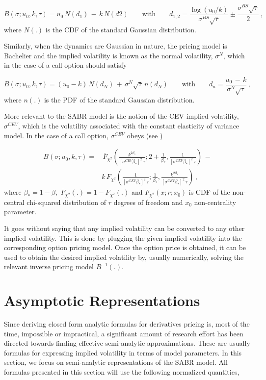 \documentclass[12pt,oneside]{article}
\newcommand{\beqn}{\begin{equation}}
\newcommand{\eeqn}{\end{equation}}
\numberwithin{equation}{section}
\begin{document}
\beqn
B(\sigma;u_0,k,\tau)=u_0\,N(d_1)\,-\,k\,N(d2)\quad\quad\text{with}\quad\quad
d_{1,2}=\frac{\log(u_0/k)}{\sigma^{BS}\sqrt{\tau}}
\pm \frac{\sigma^{BS}\sqrt{\tau}}{2}\,,
\eeqn
where $N(.)$ is the CDF of the standard Gaussian distribution.

Similarly, when the dynamics are Gaussian in nature, the 
pricing model is Bachelier and the implied volatility is known as the
normal volatility, $\sigma^{N}$, which
in the case of a call option should satisfy

\beqn
B(\sigma;u_0,k,\tau)=(u_0-k)\,N(d_N)\,+\,\sigma^{N}\sqrt{\tau}\,n(d_N)\quad\quad
\text{with}\quad\quad d_n=\frac{u_0\,-\,k}{\sigma^N\sqrt{\tau}}\,,
\eeqn
where $n(.)$ is the PDF of the standard Gaussian distribution.

More relevant to the SABR model is the notion of the CEV implied volatility,
$\sigma^{CEV}$,
which is the volatility associated with the constant elasticity of variance
model.
In the case of a call option, $\sigma^{CEV}$ obeys (see \cite{CW})

\beqn
\begin{aligned}
B(\sigma;u_0,k,\tau)=&\,\bar{F}_{\chi^2}\left(\frac{k^{2\beta_*}}{[\sigma^{CEV}\beta_*]^2\,\tau};
2+\frac{1}{\beta_*},\frac{1}{[\sigma^{CEV}\beta_*]^2\,\tau}\right)\,-\\[5pt]
&k\,
F_{\chi^2}\left(\frac{1}{[\sigma^{CEV}\beta_*]^2\,\tau};
\frac{1}{\beta_*},\frac{k^{2\beta_*}}{[\sigma^{CEV}\beta_*]^2\,\tau}\right)\,,
\end{aligned}
\eeqn
where $\beta_*\!=\!1\!-\!\beta$, $\,\bar{F}_{\chi^2}(.)\!=\!1-\!F_{\chi^2}(.)$ and
$F_{\chi^2}(x;r;x_0)$ is CDF of the non-central chi-squared distribution 
of $r$ degrees of freedom and $x_0$ non-centrality parameter.

It goes without saying that any implied volatility can be converted to
any other implied volatility.
This is done by plugging the given implied volatility into the
corresponding option pricing model.
Once the option price is obtained, it can be used to obtain the
desired implied volatility by, usually numerically, solving the
relevant inverse pricing model $B^{-1}(.)$.

\section{Asymptotic Representations}\label{sec:asym}
Since deriving closed form analytic formulas for derivatives pricing is,
most of the time, impossible or impractical,
a significant amount of research effort has been directed towards
finding effective semi-analytic approximations.
These are usually formulas for expressing implied volatility in terms
of model parameters.
In this section, we focus on semi-analytic representations of the SABR model.
All formulas presented in this section will use the following
normalized quantities,
\end{document}
